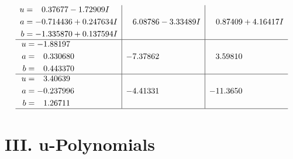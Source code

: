\documentclass[1p]{elsarticle_modified}
\theoremstyle{definition}
\begin{document}
$$\begin{array}{c|c|c}
\begin{aligned}
u &= \phantom{-}0.37677 - 1.72909 I \\
a &= -0.714436 + 0.247634 I \\
b &= -1.335870 + 0.137594 I\end{aligned}
 & \phantom{-}6.08786 - 3.33489 I & \phantom{-}0.87409 + 4.16417 I \\ \hline\begin{aligned}
u &= -1.88197\phantom{ +0.000000I} \\
a &= \phantom{-}0.330680\phantom{ +0.000000I} \\
b &= \phantom{-}0.443370\phantom{ +0.000000I}\end{aligned}
 & -7.37862\phantom{ +0.000000I} & \phantom{-}3.59810\phantom{ +0.000000I} \\ \hline\begin{aligned}
u &= \phantom{-}3.40639\phantom{ +0.000000I} \\
a &= -0.237996\phantom{ +0.000000I} \\
b &= \phantom{-}1.26711\phantom{ +0.000000I}\end{aligned}
 & -4.41331\phantom{ +0.000000I} & -11.3650\phantom{ +0.000000I}\\
 \hline 
 \end{array}$$\newpage
\newpage\renewcommand{\arraystretch}{1}
\centering \section*{ III. u-Polynomials}
\end{document}
